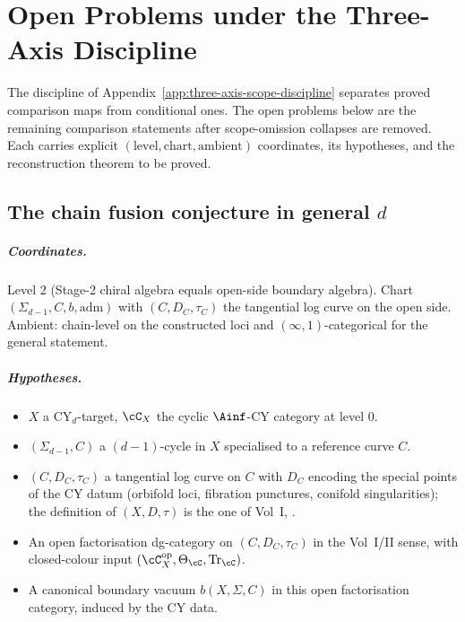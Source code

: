 \chapter{Open Problems under the Three-Axis Discipline}
\label{ch:open-frontiers}

\providecommand{\Zder}{Z^{\mathrm{der}}_{\mathrm{ch}}}
\providecommand{\GRTone}{\mathrm{GRT}_1(\mathbb{Q})}

The discipline of Appendix~\ref{app:three-axis-scope-discipline} separates
proved comparison maps from conditional ones. The open problems below are
the remaining comparison statements after scope-omission collapses are removed.
Each carries explicit
$(\text{level}, \text{chart}, \text{ambient})$ coordinates, its hypotheses,
and the reconstruction theorem to be proved.

\section{The chain fusion conjecture in general $d$}
\label{sec:open-chain-fusion}

\paragraph{Coordinates.} Level 2 (Stage-2 chiral algebra equals open-side
boundary algebra). Chart $(\Sigma_{d-1}, C, b, \mathrm{adm})$ with
$(C, D_C, \tau_C)$ the tangential log curve on the open side. Ambient:
chain-level on the constructed loci and $(\infty, 1)$-categorical for the
general statement.

\paragraph{Hypotheses.}
\begin{itemize}[nosep]
\item $X$ a $\mathrm{CY}_d$-target, $\cC_X$ the cyclic $\Ainf$-CY
  category at level 0.
\item $(\Sigma_{d-1}, C)$ a $(d{-}1)$-cycle in $X$ specialised to a
  reference curve $C$.
\item $(C, D_C, \tau_C)$ a tangential log curve on $C$ with $D_C$
  encoding the special points of the CY datum (orbifold loci, fibration
  punctures, conifold singularities); the definition of $(X, D, \tau)$
  is the one of Vol~I,
  \cite{VolI}.
\item An open factorisation dg-category on $(C, D_C, \tau_C)$ in the
  Vol~I/II sense, with closed-colour input
  $(\cC_X^{\mathrm{op}}, \Theta_{\cC}, \mathrm{Tr}_{\cC})$.
\item A canonical boundary vacuum $b(X, \Sigma, C)$ in this open
  factorisation category, induced by the CY data.
\end{itemize}

